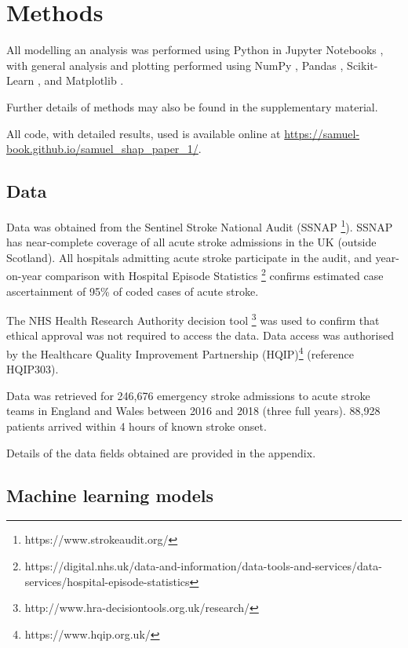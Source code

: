 \renewcommand{\thefootnote}{\alph{footnote}} %

\section{Methods}

All modelling an analysis was performed using Python in Jupyter Notebooks \cite{kluyver_jupyter_2016}, with general analysis and plotting performed using NumPy \cite{harris_array_2020}, Pandas \cite{mckinney-proc-scipy-2010}, Scikit-Learn  \cite{pedregosa_scikit-learn_2011}, and Matplotlib \cite{hunter_matplotlib_2007}. 

Further details of methods may also be found in the supplementary material. 

All code, with detailed results, used is available online at \url{https://samuel-book.github.io/samuel_shap_paper_1/}.

\subsection{Data}

Data was obtained from the Sentinel Stroke National Audit (SSNAP \footnote{https://www.strokeaudit.org/}). SSNAP has near-complete coverage of all acute stroke admissions in the UK (outside Scotland). All hospitals admitting acute stroke participate in the audit, and year-on-year comparison with Hospital Episode Statistics \footnote{https://digital.nhs.uk/data-and-information/data-tools-and-services/data-services/hospital-episode-statistics} confirms estimated case ascertainment of 95\% of coded cases of acute stroke.

The NHS Health Research Authority decision tool \footnote{http://www.hra-decisiontools.org.uk/research/} was used to confirm that ethical approval was not required to access the data. Data access was authorised by the Healthcare Quality Improvement Partnership (HQIP)\footnote{https://www.hqip.org.uk/} (reference HQIP303). 

Data was retrieved for 246,676 emergency stroke admissions to acute stroke teams in England and Wales between 2016 and 2018 (three full years). 88,928 patients arrived within 4 hours of known stroke onset.

Details of the data fields obtained are provided in the appendix.

\subsection{Machine learning models}

